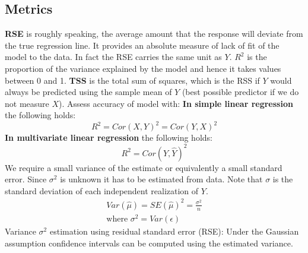 \documentclass[../Main.tex]{subfiles}
\begin{document}
\subsection{Metrics}
\textbf{RSE} is roughly speaking, the average amount that the response will deviate from the true regression line. It provides an absolute measure of lack of fit of the model to the data. In fact the RSE carries the same unit as \(Y\).\textbf{ \(R^2\)} is the proportion of the variance explained by the model and hence it takes values between 0 and 1. \textbf{TSS} is the total sum of squares, which is the RSS if \(Y\) would always be predicted using the sample mean of \(Y\) (best possible predictor if we do not measure \(X\)). Assess accuracy of model with:
\textbf{In simple linear regression} the following holds:
\begin{equation}
    R^2 = Cor(X,Y)^2 = Cor(Y,X)^2
\end{equation}
\textbf{In multivariate linear regression} the following holds:
\begin{equation}
    R^2 = Cor(Y,\hat{Y})^2
\end{equation}
We require a small variance of the estimate or equivalently a small standard error. Since \(\sigma^2\) is unknown it has to be estimated from data. Note that \(\sigma\) is the standard deviation of each independent realization of \(Y\).
\begin{equation}
    \begin{split}
         Var(\hat{\mu}) = SE(\hat{\mu})^2 = \frac{\sigma^2}{n}\\
         \text{where } \sigma^2 = Var(\epsilon)
    \end{split}
\end{equation}
Variance \(\sigma^2\) estimation using residual standard error (RSE):
Under the Gaussian assumption confidence intervals can be computed using the estimated variance. 
\end{document}
